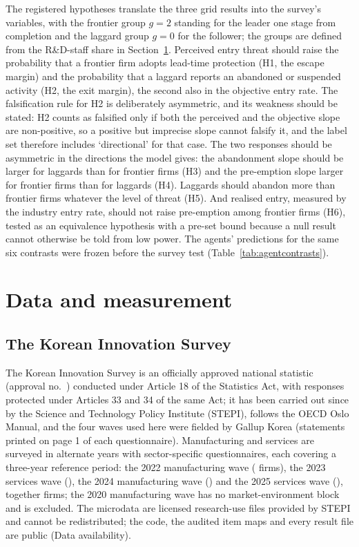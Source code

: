 \documentclass[preprint,12pt,authoryear]{elsarticle}
\begin{document}
The registered hypotheses translate the three grid results into the survey's variables, with the frontier group $g = 2$ standing for the leader one stage from completion and the laggard group $g = 0$ for the follower; the groups are defined from the R\&D-staff share in Section~\ref{sec:data}. Perceived entry threat should raise the probability that a frontier firm adopts lead-time protection (H1, the escape margin) and the probability that a laggard reports an abandoned or suspended activity (H2, the exit margin), the second also in the objective entry rate. The falsification rule for H2 is deliberately asymmetric, and its weakness should be stated: H2 counts as falsified only if both the perceived and the objective slope are non-positive, so a positive but imprecise slope cannot falsify it, and the label set therefore includes `directional' for that case. The two responses should be asymmetric in the directions the model gives: the abandonment slope should be larger for laggards than for frontier firms (H3) and the pre-emption slope larger for frontier firms than for laggards (H4). Laggards should abandon more than frontier firms whatever the level of threat (H5). And realised entry, measured by the industry entry rate, should not raise pre-emption among frontier firms (H6), tested as an equivalence hypothesis with a pre-set bound because a null result cannot otherwise be told from low power. The agents' predictions for the same six contrasts were frozen before the survey test (Table~\ref{tab:agentcontrasts}).

\section{Data and measurement}
\label{sec:data}

\subsection{The Korean Innovation Survey}

The Korean Innovation Survey is an officially approved national statistic (approval no.\ \KISApprovalNo) conducted under Article 18 of the Statistics Act, with responses protected under Articles 33 and 34 of the same Act; it has been carried out since \KISSinceYear{} by the Science and Technology Policy Institute (STEPI), follows the OECD Oslo Manual, and the four waves used here were fielded by Gallup Korea (statements printed on page 1 of each questionnaire). Manufacturing and services are surveyed in alternate years with sector-specific questionnaires, each covering a three-year reference period: the 2022 manufacturing wave (\NTwoZeroTwoTwoM{} firms), the 2023 services wave (\NTwoZeroTwoThreeS), the 2024 manufacturing wave (\NTwoZeroTwoFourM) and the 2025 services wave (\NTwoZeroTwoFiveS), together \NFirms{} firms; the 2020 manufacturing wave has no market-environment block and is excluded. The microdata are licensed research-use files provided by STEPI and cannot be redistributed; the code, the audited item maps and every result file are public (Data availability).
\end{document}

